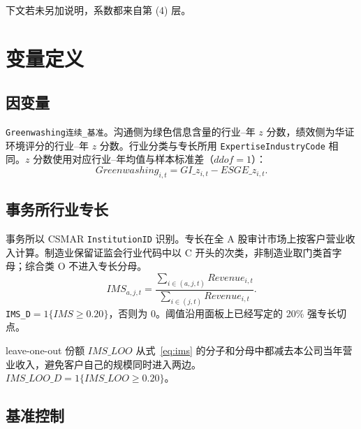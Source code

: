 \documentclass[11pt]{article}
\begin{document}
下文若未另加说明，系数都来自第 (4) 层。

\section{变量定义}

\subsection{因变量}

\texttt{Greenwashing连续\_基准}。沟通侧为绿色信息含量的行业--年 \(z\) 分数，绩效侧为华证环境评分的行业--年 \(z\) 分数。行业分类与专长所用 \texttt{ExpertiseIndustryCode} 相同。\(z\) 分数使用对应行业--年均值与样本标准差（\(ddof=1\)）：
\[
Greenwashing_{i,t}=GI\_z_{i,t}-ESGE\_z_{i,t}.
\]

\subsection{事务所行业专长}

事务所以 CSMAR \texttt{InstitutionID} 识别。专长在全 A 股审计市场上按客户营业收入计算。制造业保留证监会行业代码中以 C 开头的次类，非制造业取门类首字母；综合类 O 不进入专长分母。
\begin{equation}
IMS_{a,j,t}=\frac{\sum_{i\in(a,j,t)}Revenue_{i,t}}{\sum_{i\in(j,t)}Revenue_{i,t}}.
\label{eq:ims}
\end{equation}
\texttt{IMS\_D}\(=1\{IMS\ge 0.20\}\)，否则为 0。阈值沿用面板上已经写定的 20\% 强专长切点。

leave-one-out 份额 \(IMS\_LOO\) 从式~\eqref{eq:ims} 的分子和分母中都减去本公司当年营业收入，避免客户自己的规模同时进入两边。\(IMS\_LOO\_D=1\{IMS\_LOO\ge 0.20\}\)。

\subsection{基准控制}
\end{document}
